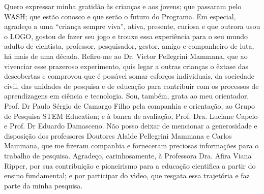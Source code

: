 \begin{agradecimentos}
Quero expressar minha gratid\~ao \`as crian\c{c}as e aos jovens; que passaram pelo WASH; que est\~ao conosco e que ser\~ao o futuro do Programa.
Em especial, agrade\c{c}o a uma “crian\c{c}a sempre viva”, ativa, presente, curiosa e que outrora usou o LOGO, gostou de fazer seu jogo e trouxe essa experi\^encia para o seu mundo adulto de cientista, professor, pesquisador, gestor, amigo e companheiro de luta, h\'a mais de uma d\'ecada. Refiro-me ao Dr. Victor Pellegrini Mammana, que ao vivenciar esse prazeroso experimento, quis legar a outras crian\c{c}as o \^extase das descobertas e comprovou que \'e poss\'{\i}vel somar esfor\c{c}os individuais, da sociedade civil, das unidades de pesquisa e de educa\c{c}\~ao para contribuir com os processos de aprendizagens em ci\^encia e tecnologia.
Sou, tamb\'em, grata ao meu orientador, Prof. Dr Paulo S\'ergio de Camargo Filho pela companhia e orienta\c{c}\~ao, ao Grupo de Pesquisa STEM Education; e \`a banca de avalia\c{c}\~ao, Prof. Dra. Luciane Capelo e Prof. Dr Eduardo Damasceno.
N\~ao posso deixar de mencionar a generosidade e disposi\c{c}\~ao dos professores Doutores Ala\'{\i}de Pellegrini Mammana e Carlos Mammana, que me fizeram companhia e forneceram preciosas informa\c{c}\~oes para o trabalho de pesquisa.
Agrade\c{c}o, carinhosamente, \`a Professora Dra. Afira Viana Ripper, por sua contribui\c{c}\~ao e pioneirismo para a educa\c{c}\~ao cientifica a partir do ensino fundamental; e por participar do v\'{\i}deo, que resgata essa trajet\'oria e faz parte da minha pesquisa.

\end{agradecimentos}
